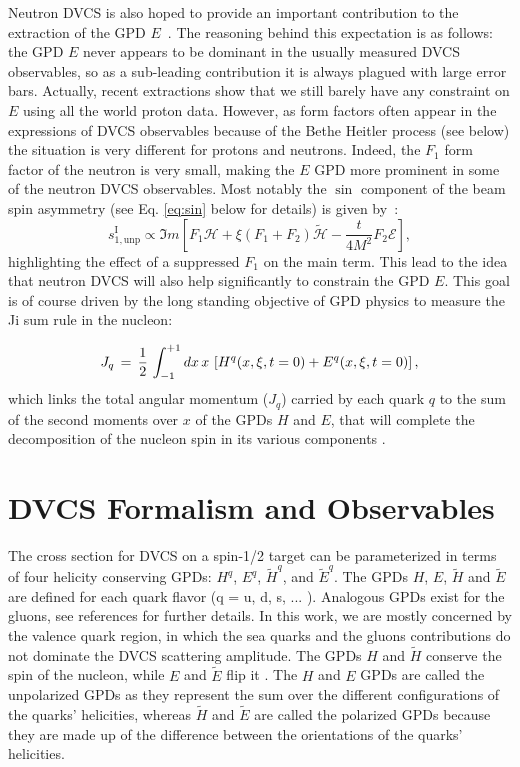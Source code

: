 Neutron DVCS is also hoped to provide an important contribution to the 
extraction of the GPD $E$~\cite{dHose:2016mda}. The reasoning behind this 
expectation is as follows: the GPD $E$ never appears to be dominant in the 
usually measured DVCS observables, so as a sub-leading contribution it is 
always plagued with large error bars. Actually, recent extractions 
\cite{Dupre:2017hfs,Moutarde:2018kwr} show that we still barely have any 
constraint on $E$ using all the world proton data. However, as form factors 
often appear in the expressions of
DVCS observables because of the Bethe Heitler process (see below) the situation 
is very different for protons and neutrons. Indeed, the $F_1$ form factor of the 
neutron is very small, making the $E$ GPD more prominent in some of the neutron DVCS 
observables. Most notably the $\sin$ component of the beam spin asymmetry 
(see Eq. \ref{eq:sin} below for details) is given 
by~\cite{dHose:2016mda}:
\begin{equation}
s^\textrm{I}_{1,\textrm{unp}} \propto \Im m \left [ 
F_1 \mathcal{H} + \xi(F_1 + F_2) \mathcal{\tilde H} - \frac{t}{4M^2} F_2  \mathcal{E} \right ],
\end{equation}
highlighting the effect of a suppressed $F_1$ on the main term.
This lead to the idea that neutron DVCS will also help significantly to constrain the 
GPD $E$. This goal is of course driven by the long standing objective of GPD physics to
measure the Ji sum rule in the nucleon:

\begin{equation}
J_q \,=\, {1 \over 2} \, \int_{-1}^{+1} d x \, x \, 
\left[ H^{q}(x,\xi,t = 0) + E^{q}(x,\xi,t = 0) \right],
\label{eq:dvcs_spin}
\end{equation}
which links the total angular momentum ($J_q$) carried by each quark $q$ to the 
sum of the second moments over $x$ of the GPDs $H$ and $E$, that will complete 
the decomposition of the nucleon spin in its various components 
\cite{Ji:1996ek,Leader:2013jra}. 

\section{DVCS Formalism and Observables}

The cross section for DVCS on a spin-1/2 target can be parameterized in terms 
of four helicity conserving GPDs: $H^q$, $E^q$, $\tilde{H}^q$, and 
$\tilde{E}^q$. The GPDs $H$, $E$, $\widetilde{H}$ and $\widetilde{E}$ are 
defined for each quark flavor (q = u, d, s, ... ). Analogous GPDs exist for the 
gluons, see references \cite{PhysRevD.56.5524,Goeke:2001tz} for further 
details.  In this work, we are mostly concerned by the valence quark region, in 
which the sea quarks and the gluons contributions do not dominate the DVCS 
scattering amplitude. The GPDs $H$ and $\widetilde{H}$ conserve the spin of the 
nucleon, while $E$ and $\widetilde{E}$ flip it \cite{Diehl:2001pm}. The $H$ and 
$E$ GPDs are called the unpolarized GPDs as they represent the sum over the 
different configurations of the quarks' helicities, whereas $\widetilde{H}$ and 
$\widetilde{E}$ are called the polarized GPDs because they are made up of the 
difference between the orientations of the quarks' helicities.

